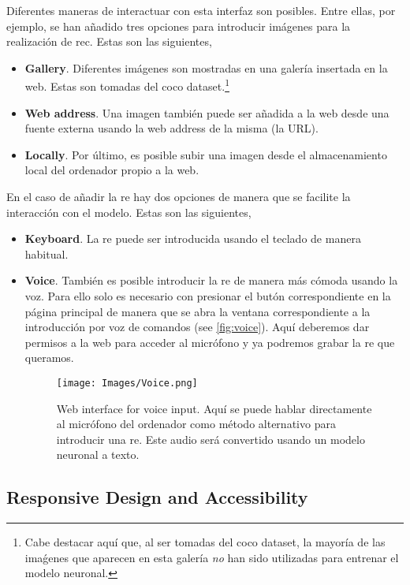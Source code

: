 Diferentes maneras de interactuar con esta interfaz son posibles. Entre ellas,
por ejemplo, se han añadido tres opciones para introducir imágenes para la
realización de \gls{rec}. Estas son las siguientes,
\begin{itemize}
  \item \textbf{Gallery}. Diferentes imágenes son mostradas en una galería
  insertada en la web. Estas son tomadas del \gls{coco} dataset.\footnote{Cabe
    destacar aquí que, al ser tomadas del \gls{coco} dataset, la mayoría de las
    imaǵenes que aparecen en esta galería \emph{no} han sido utilizadas para
    entrenar el modelo neuronal.}
  \item \textbf{Web address}. Una imagen también puede ser añadida a la web
  desde una fuente externa usando la web address de la misma (la URL).
  \item \textbf{Locally}. Por último, es posible subir una imagen desde el
  almacenamiento local del ordenador propio a la web.
\end{itemize}

En el caso de añadir la \gls{re} hay dos opciones de manera que se facilite la
interacción con el modelo. Estas son las siguientes,
\begin{itemize}
  \item \textbf{Keyboard}. La \gls{re} puede ser introducida usando el teclado
  de manera habitual.
  \item \textbf{Voice}. También es posible introducir la \gls{re} de manera más
  cómoda usando la voz. Para ello solo es necesario con presionar el butón
  correspondiente en la página principal de manera que se abra la ventana
  correspondiente a la introducción por voz de comandos (see
  \vref{fig:voice}). Aquí deberemos dar permisos a la web para acceder al
  micrófono y ya podremos grabar la \gls{re} que queramos.
  \begin{figure}[htb]
    \centering
    \texttt{[image: Images/Voice.png]}
    \caption[Web interface for voice input]{Web interface for voice input. Aquí
      se puede hablar directamente al micrófono del ordenador como método
      alternativo para introducir una \gls{re}. Este audio será convertido
      usando un modelo neuronal a texto.}\label{fig:voice}
  \end{figure}
\end{itemize}

\subsection{Responsive Design and Accessibility}%

